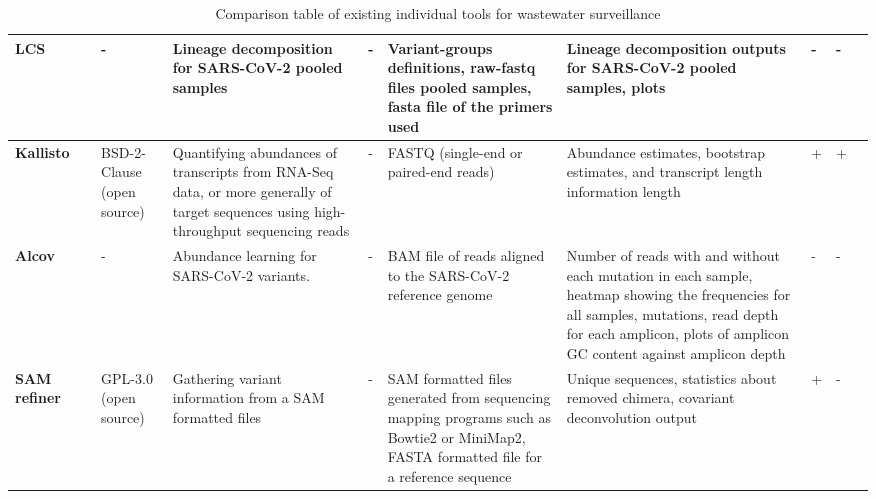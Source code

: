 \begin{landscape}
\begin{table}[ht!]
\begin{tabular}{l|l|l|l|l|l|l|l|l|l}
\multicolumn{1}{m{1cm}|}{\textbf{LCS}}&\multicolumn{1}{m{1cm}|}{\cite{valieris2022}}&\multicolumn{1}{m{1cm}|}{-}&\multicolumn{1}{m{3cm}|}{Lineage decomposition for SARS-CoV-2 pooled samples}&\multicolumn{1}{m{3cm}|}{-}&\multicolumn{1}{m{3cm}|}{Variant-groups definitions, raw-fastq files pooled samples, fasta file of the primers used}&\multicolumn{1}{m{3cm}|}{Lineage decomposition outputs for SARS-CoV-2 pooled samples, plots}&\multicolumn{1}{m{1cm}|}{-}&\multicolumn{1}{m{1cm}|}{-}&\multicolumn{1}{m{1cm}}{\cite{valieris2022,karthikeyan2022b}}\\ \hline 
\multicolumn{1}{m{1cm}|}{\textbf{Kallisto}}&\multicolumn{1}{m{1cm}|}{\cite{bray2016}}&\multicolumn{1}{m{1cm}|}{ BSD-2-Clause (open source)}&\multicolumn{1}{m{3cm}|}{Quantifying abundances of transcripts from RNA-Seq data, or more generally of target sequences using high-throughput sequencing reads}&\multicolumn{1}{m{3cm}|}{-}&\multicolumn{1}{m{3cm}|}{FASTQ (single-end or paired-end reads)}&\multicolumn{1}{m{3cm}|}{Abundance estimates, bootstrap estimates, and transcript length information length}&\multicolumn{1}{m{1cm}|}{+}&\multicolumn{1}{m{1cm}|}{+}&\multicolumn{1}{m{1cm}}{\cite{baaijens2021,anton2022}}\\ \hline 
\multicolumn{1}{m{1cm}|}{\textbf{Alcov}}&\multicolumn{1}{m{1cm}|}{\cite{ellmen2021}}&\multicolumn{1}{m{1cm}|}{-}&\multicolumn{1}{m{3cm}|}{Abundance learning for SARS-CoV-2 variants.}&\multicolumn{1}{m{3cm}|}{-}&\multicolumn{1}{m{3cm}|}{BAM file of reads aligned to the SARS-CoV-2 reference genome}&\multicolumn{1}{m{3cm}|}{Number of reads with and without each mutation in each sample, heatmap showing the frequencies for all samples, mutations, read depth for each amplicon, plots of amplicon GC content against amplicon depth}&\multicolumn{1}{m{1cm}|}{-}&\multicolumn{1}{m{1cm}|}{-}&\multicolumn{1}{m{1cm}}{\cite{ellmen2021}}\\ \hline 
\multicolumn{1}{m{1cm}|}{\textbf{SAM refiner}}&\multicolumn{1}{m{1cm}|}{\cite{gregory2021}}&\multicolumn{1}{m{1cm}|}{GPL-3.0 (open source)}&\multicolumn{1}{m{3cm}|}{Gathering variant information from a SAM formatted files}&\multicolumn{1}{m{3cm}|}{-}&\multicolumn{1}{m{3cm}|}{SAM formatted files generated from sequencing mapping programs such as Bowtie2 or MiniMap2, FASTA formatted file for a reference sequence}&\multicolumn{1}{m{3cm}|}{Unique sequences, statistics about removed chimera, covariant deconvolution output}&\multicolumn{1}{m{1cm}|}{+}&\multicolumn{1}{m{1cm}|}{-}&\multicolumn{1}{m{1cm}}{\cite{gregory2021,gregory2022,yaglom2022}}\\ \hline 
\end{tabular}
                \caption{Comparison table of existing individual tools for wastewater surveillance} \label{tab:prior:methods-tools}
                \end{table}


\end{landscape}
